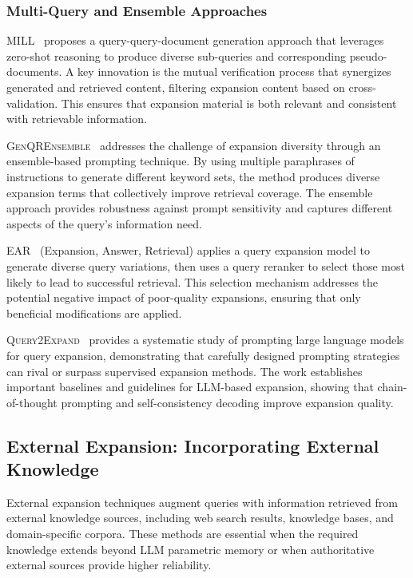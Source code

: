 \documentclass{article}
\begin{document}
\subsubsection{Multi-Query and Ensemble Approaches}

\textsc{MILL}~\citep{MILL} proposes a query-query-document generation approach that leverages zero-shot reasoning to produce diverse sub-queries and corresponding pseudo-documents. A key innovation is the mutual verification process that synergizes generated and retrieved content, filtering expansion content based on cross-validation. This ensures that expansion material is both relevant and consistent with retrievable information.

\textsc{GenQREnsemble}~\citep{GenQREnsemble} addresses the challenge of expansion diversity through an ensemble-based prompting technique. By using multiple paraphrases of instructions to generate different keyword sets, the method produces diverse expansion terms that collectively improve retrieval coverage. The ensemble approach provides robustness against prompt sensitivity and captures different aspects of the query's information need.

\textsc{EAR}~\citep{EAR} (Expansion, Answer, Retrieval) applies a query expansion model to generate diverse query variations, then uses a query reranker to select those most likely to lead to successful retrieval. This selection mechanism addresses the potential negative impact of poor-quality expansions, ensuring that only beneficial modifications are applied.

\textsc{Query2Expand}~\citep{Query2Expand} provides a systematic study of prompting large language models for query expansion, demonstrating that carefully designed prompting strategies can rival or surpass supervised expansion methods. The work establishes important baselines and guidelines for LLM-based expansion, showing that chain-of-thought prompting and self-consistency decoding improve expansion quality.

\subsection{External Expansion: Incorporating External Knowledge}

External expansion techniques augment queries with information retrieved from external knowledge sources, including web search results, knowledge bases, and domain-specific corpora. These methods are essential when the required knowledge extends beyond LLM parametric memory or when authoritative external sources provide higher reliability.
\end{document}
